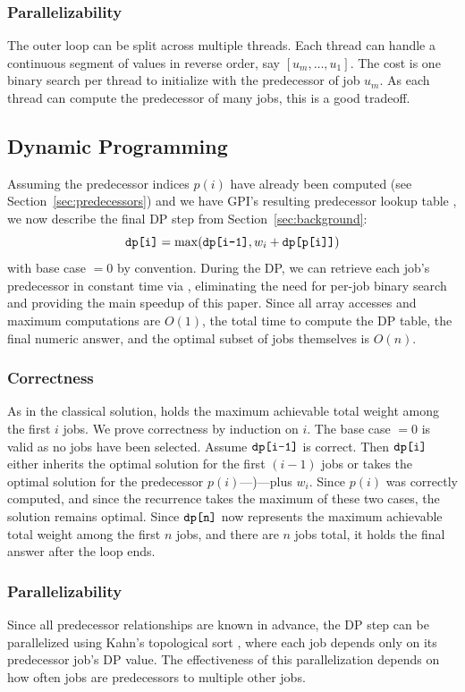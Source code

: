 \documentclass[final,5p,times]{elsarticle}
\newcommand{\code}[1]{\texttt{\detokenize{#1}}}
\begin{document}
\subsubsection*{Parallelizability}
The outer loop can be split across multiple threads. Each thread can handle a continuous segment of \code{start_index} values in reverse order, say $[u_m, \ldots, u_1]$. The cost is one binary search per thread to initialize \code{end_index} with the predecessor of job $u_m$. As each thread can compute the predecessor of many jobs, this is a good tradeoff.

\subsection{Dynamic Programming}
Assuming the predecessor indices $p(i)$ have already been computed (see Section~\ref{sec:predecessors}) and we have GPI's resulting predecessor lookup table \code{p}, we now describe the final DP step from Section~\ref{sec:background}:
\[
\code{dp[i]} = \max(\code{dp[i-1]}, w_i + \code{dp[p[i]]})
\]
with base case \code{dp[0]} $=0$ by convention. During the DP, we can retrieve each job's predecessor in constant time via \code{p}, eliminating the need for per-job binary search and providing the main speedup of this paper. Since all array accesses and maximum computations are $O(1)$, the total time to compute the DP table, the final numeric answer, and the optimal subset of jobs themselves is $O(n)$.

\subsubsection*{Correctness}

As in the classical solution, \code{dp[i]} holds the maximum achievable total weight among the first $i$ jobs. We prove correctness by induction on $i$. The base case \code{dp[0]} $=0$ is valid as no jobs have been selected. Assume $\code{dp[i-1]}$ is correct. Then $\code{dp[i]}$ either inherits the optimal solution for the first $(i-1)$ jobs or takes the optimal solution for the predecessor $p(i)$\thinspace---\thinspace\code{dp[p[i]]})\thinspace---\thinspace plus $w_i$. Since $p(i)$ was correctly computed, and since the recurrence takes the maximum of these two cases, the solution remains optimal. Since $\code{dp[n]}$ now represents the maximum achievable total weight among the first $n$ jobs, and there are $n$ jobs total, it holds the final answer after the loop ends.

\subsubsection*{Parallelizability}
Since all predecessor relationships are known in advance, the DP step can be parallelized using Kahn's topological sort \cite{kahn1962}, where each job depends only on its predecessor job's DP value. The effectiveness of this parallelization depends on how often jobs are predecessors to multiple other jobs. 
\end{document}
